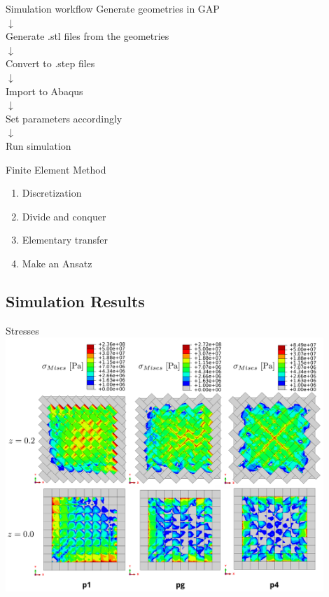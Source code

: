 \documentclass{beamer}
\numberwithin{equation}{aufgabe}
\begin{document}
\begin{frame}{Simulation workflow}
    Generate geometries in GAP\\
    \pause $\downarrow$\\
    Generate .stl files from the geometries\\
    \pause $\downarrow$\\
    Convert to .step files \\
    \pause $\downarrow$\\
    Import to Abaqus\\
    \pause $\downarrow$\\
    Set parameters accordingly\\
    \pause $\downarrow$\\
    Run simulation
\end{frame}

\begin{frame}{Finite Element Method}
    \begin{enumerate}
        \item Discretization \pause
        \item Divide and conquer \pause
        \item Elementary transfer \pause
        \item Make an Ansatz
    \end{enumerate}
\end{frame}

\subsection{Simulation Results}
\begin{frame}{Stresses}
    \includegraphics[width=0.9\textwidth]{images/Sm.png}
\end{frame}
\end{document}

